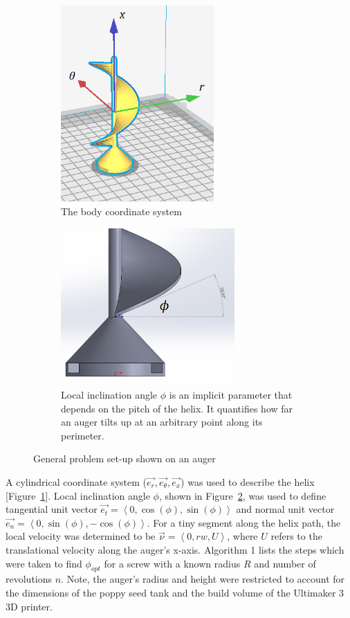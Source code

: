 \documentclass[letterpaper, 11 pt]{article}
\begin{document}
\begin{figure}[H]
\centering
\begin{subfigure}{.5\textwidth}
	\centering
	\includegraphics[height=7.5cm]{./imgs/helix_csys}
	\caption{The body coordinate system}
	\label{fig:helix_csys}
\end{subfigure}%
\begin{subfigure}{.5\textwidth}
\centering
\includegraphics[height=6cm]{./imgs/helix_phi}
\caption{Local inclination angle $\phi$ is an implicit parameter that depends on the pitch of the helix. It quantifies how far an auger tilts up at an arbitrary point along its perimeter.}
\label{fig:helix_phi}
\end{subfigure}
\caption{General problem set-up shown on an auger}
\label{probSetup}
\end{figure}
 
A cylindrical coordinate system ($\vec{e_r}, \vec{e_\theta}, \vec{e_x}$) was used to describe the helix [Figure~\ref{fig:helix_csys}]. Local inclination angle $\phi$, shown in Figure~\ref{fig:helix_phi}, was used to define tangential unit vector $\vec{e_t} = \left\langle 0, \cos(\phi),\sin(\phi)\right\rangle $ and normal unit vector $\vec{e_n} = \left\langle 0, \sin(\phi), -\cos(\phi)\right\rangle $. For a tiny segment along the helix path, the local velocity was determined to be $\vec{\nu} = \left\langle 0, rw, U\right\rangle $, where $U$ refers to the translational velocity along the auger's x-axis. Algorithm 1 lists the steps which were taken to find $\phi_{opt}$ for a screw with a known radius $R$ and number of revolutions $n$. Note, the auger's radius and height were restricted to account for the dimensions of the poppy seed tank and the build volume of the Ultimaker 3 3D printer.  
\end{document}
